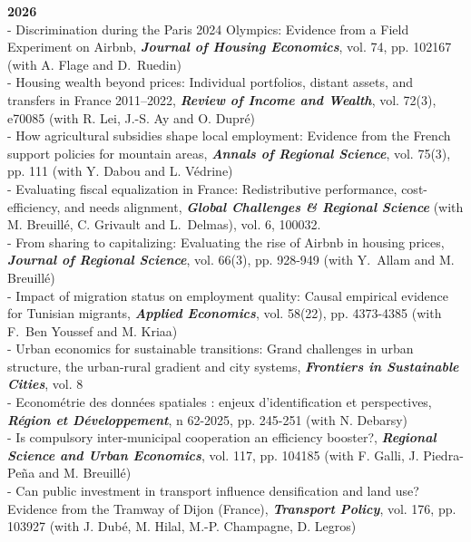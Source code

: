 \documentclass[a4paper,12pt]{article}
\begin{document}
\noindent \textbf{2026}  \smallskip \\
- Discrimination during the Paris 2024 Olympics: Evidence from a Field Experiment on Airbnb, \textit{\textbf{Journal of Housing Economics}}, vol. 74, pp. 102167 (with A. Flage and D.~Ruedin)\\
- Housing wealth beyond prices: Individual portfolios, distant assets, and transfers in France 2011–2022, \textit{\textbf{Review of Income and Wealth}}, vol. 72(3), e70085 (with R. Lei, J.-S. Ay and O. Dupré)\\
- How agricultural subsidies shape local employment: Evidence from the French support policies for mountain areas, \textit{\textbf{Annals of Regional Science}}, vol. 75(3), pp. 111  (with Y. Dabou and L. Védrine)\\
- Evaluating fiscal equalization in France: Redistributive performance, cost-efficiency, and needs alignment, \textit{\textbf{Global Challenges \& Regional Science}} (with M. Breuillé, C. Grivault and L.~Delmas), vol. 6, 100032. \\
- From sharing to capitalizing: Evaluating the rise of Airbnb in housing prices, \textit{\textbf{Journal of Regional Science}}, vol. 66(3), pp. 928-949  (with Y.~Allam and M. Breuillé) \\
- Impact of migration status on employment quality: Causal empirical evidence for Tunisian migrants, \textit{\textbf{Applied Economics}}, vol. 58(22), pp. 4373-4385 (with F.~Ben Youssef and M. Kriaa) \\
- Urban economics for sustainable transitions: Grand challenges in urban structure, the urban-rural gradient and city systems, \textit{\textbf{Frontiers in Sustainable Cities}}, vol. 8 \\
- Econométrie des données spatiales : enjeux d'identification et perspectives, \textit{\textbf{Région et Développement}}, n 62-2025, pp. 245-251 (with N. Debarsy)\\
- Is compulsory inter-municipal cooperation an efficiency booster?, \textit{\textbf{Regional Science and Urban Economics}}, vol. 117, pp. 104185 (with F. Galli, J. Piedra-Peña and M. Breuillé) \\
- Can public investment in transport influence densification and land use? Evidence from the Tramway of Dijon (France), \textit{\textbf{Transport Policy}}, vol. 176, pp. 103927 (with J. Dubé, M. Hilal, M.-P. Champagne, D. Legros) \\
\end{document}

